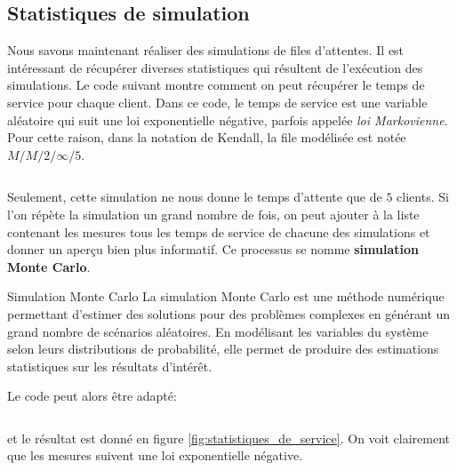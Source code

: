         \subsection{Statistiques de simulation}
            Nous savons maintenant réaliser des simulations de files d'attentes. Il est intéressant de récupérer diverses statistiques qui résultent de l'exécution des simulations. Le code suivant montre comment on peut récupérer le temps de service pour chaque client. Dans ce code, le temps de service est une variable aléatoire qui suit une loi exponentielle négative, parfois appelée \textit{loi Markovienne}. Pour cette raison, dans la notation de Kendall, la file modélisée est notée $M/M/2/\infty/5$.
            \inputminted{python}{codes/statistiques_de_service.py}
            Seulement, cette simulation ne nous donne le temps d'attente que de $5$ clients. Si l'on répète la simulation un grand nombre de fois, on peut ajouter à la liste contenant les mesures tous les temps de service de chacune des simulations et donner un aperçu bien plus informatif. Ce processus se nomme \textbf{simulation Monte Carlo}.
            \begin{definition}{Simulation Monte Carlo}
                La simulation Monte Carlo est une méthode numérique permettant d'estimer des solutions pour des problèmes complexes en générant un grand nombre de scénarios aléatoires. En modélisant les variables du système selon leurs distributions de probabilité, elle permet de produire des estimations statistiques sur les résultats d'intérêt.
            \end{definition}
            Le code peut alors être adapté: 
            \inputminted{python}{codes/statistiques_de_service_2.py} et le résultat est donné en figure \ref{fig:statistiques_de_service}. On voit clairement que les mesures suivent une loi exponentielle négative.
